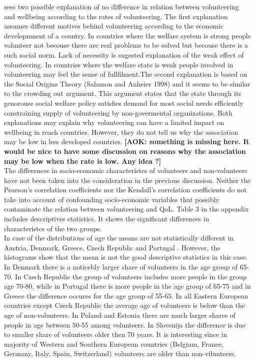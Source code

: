 \documentclass[10pt, letterpaper]{article}
\begin{document}
\begin{spacing}{1.4}
\citet{haski09} sees two possible explanation of no difference in relation between volunteering and wellbeing according to the rates of volunteering. The first explanation assumes different motives behind volunteering according to the economic developmnent of a country. In countries where the welfare system is strong people volunteer not becouse there are real problems to be solved but becouse there is a such social norm. Lack of necessity is sugested explanation of the weak effect of volunteering.  In countries where the welfare state is weak people involved in volunteering may feel the sense of fullfilment.The second explanation is based on the Social Origins Theory (Salamon and Anheier 1998) and it seems to be similar to the crowding out argument. This argument states that the state through its genorouse social welfare policy satisfies demand for most social needs efficiently constraining supply of volunteering by non-govermental organizations. Both explanations may explain why volunteering can have a limited impact on wellbeing in reach countries. However, they do not tell us why the association may be low in less developed countries. \textbf{[AOK: something is missing here. It would be nice to have some discussion on reasons why the association may be low when the rate is low. Any idea ?]} \\

The differences in socio-economic characteristcs of volunteers and non-volunteers have not been taken into the consideration in the previous discussion. Neither the Pearson's correlation coefficients nor the Kendall's correlation coefficients do not take into account of confounding socio-economic variables that possibly contaminate the relation between volunteering and QoL. Table 3 in the appendix includes descriptives statistics. It shows the significant differences in characteristcs of the two groups. \\

In case of the distributions of age the means are  not statistically different  in Austria, Denmark, Greece, Czech Republic and Portugal . However, the histograms show that the mean is not the good descriptive statistics in this case. In Denmark there is a noticebly larger share of volunteers in the age group of 65-70. In Czech Republic the group of volunteers includes more people in the group age 70-80, while in Portugal there is more people in the age group of 65-75 and in Greece the difference occures for the age group of 55-65. In  all Eastern European countries except Czech Republic the average age of volunteers is below than the age of non-volunteers. In Poland and Estonia there are much larger shares of people in age between 50-55 among volunteers.  In Slovenija the difference is due to smaller share of volunteers older then 70 years. It is interesting since in majority of Western and Southern European  countries (Belgium, France, Germany, Italy, Spain, Switzerland) volunteers are older than non-vilunteers. \\ 


\end{spacing}
\end{document}

